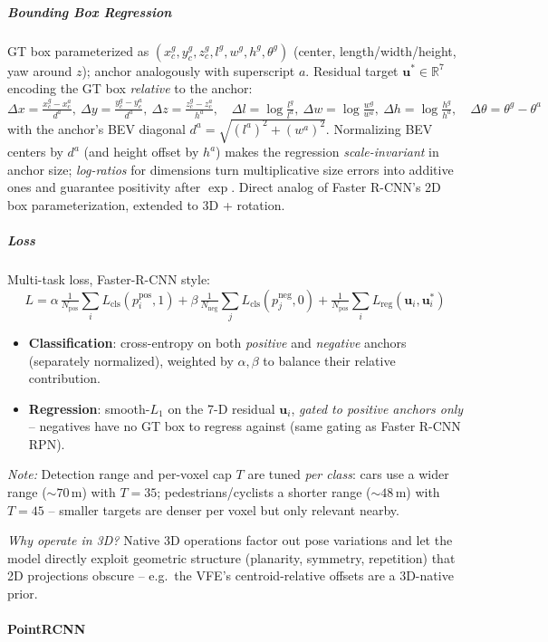 \documentclass{article}
\begin{document}
\subparagraph{Bounding Box Regression}
GT box parameterized as $(x_c^g, y_c^g, z_c^g, l^g, w^g, h^g, \theta^g)$ (center, length/width/height, yaw around $z$); anchor analogously with superscript $a$. Residual target $\mathbf{u}^* \in \mathbb{R}^7$ encoding the GT box \textit{relative} to the anchor:
$$\Delta x = \tfrac{x_c^g - x_c^a}{d^a},\ \Delta y = \tfrac{y_c^g - y_c^a}{d^a},\ \Delta z = \tfrac{z_c^g - z_c^a}{h^a}, \quad \Delta l = \log\tfrac{l^g}{l^a},\ \Delta w = \log\tfrac{w^g}{w^a},\ \Delta h = \log\tfrac{h^g}{h^a}, \quad \Delta\theta = \theta^g - \theta^a$$
with the anchor's BEV diagonal $d^a = \sqrt{(l^a)^2 + (w^a)^2}$. Normalizing BEV centers by $d^a$ (and height offset by $h^a$) makes the regression \textit{scale-invariant} in anchor size; \textit{log-ratios} for dimensions turn multiplicative size errors into additive ones and guarantee positivity after $\exp$. Direct analog of Faster R-CNN's 2D box parameterization, extended to 3D + rotation.

\subparagraph{Loss}
Multi-task loss, Faster-R-CNN style:
$$L = \alpha\, \tfrac{1}{N_{\text{pos}}}\sum_i L_{\text{cls}}(p_i^{\text{pos}}, 1) + \beta\, \tfrac{1}{N_{\text{neg}}}\sum_j L_{\text{cls}}(p_j^{\text{neg}}, 0) + \tfrac{1}{N_{\text{pos}}}\sum_i L_{\text{reg}}(\mathbf{u}_i, \mathbf{u}_i^*)$$
\begin{itemize}
    \item \textbf{Classification}: cross-entropy on both \textit{positive} and \textit{negative} anchors (separately normalized), weighted by $\alpha, \beta$ to balance their relative contribution.
    \item \textbf{Regression}: smooth-$L_1$ on the 7-D residual $\mathbf{u}_i$, \textit{gated to positive anchors only} -- negatives have no GT box to regress against (same gating as Faster R-CNN RPN).
\end{itemize}
\textit{Note:} Detection range and per-voxel cap $T$ are tuned \textit{per class}: cars use a wider range ($\sim 70$\,m) with $T=35$; pedestrians/cyclists a shorter range ($\sim 48$\,m) with $T=45$ -- smaller targets are denser per voxel but only relevant nearby.

\textit{Why operate in 3D?} Native 3D operations factor out pose variations and let the model directly exploit geometric structure (planarity, symmetry, repetition) that 2D projections obscure -- e.g.\ the VFE's centroid-relative offsets are a 3D-native prior.

\paragraph{PointRCNN}
\end{document}

